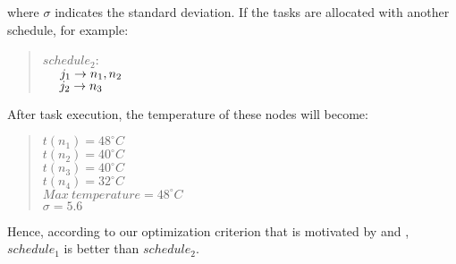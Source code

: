 where $\sigma$ indicates the standard deviation. If the tasks are allocated with another schedule, for example: 
  
\begin{quote}
$schedule_2$: \\
$\mbox{~~~~} j_1\to n_1, n_2$ \\
$\mbox{~~~~} j_2 \to n_3$ \\
\end{quote}

After task execution, the temperature of these nodes will become:

\begin{quote}
$t(n_1)=48^\circ C$ \\
$t(n_2)=40^\circ C$ \\
$t(n_3)=40^\circ C$ \\ 
$t(n_4)=32^\circ C$ \\
$Max~temperature=48^\circ C$ \\
$\sigma=5.6$ \\
\end{quote}

Hence, according to our optimization criterion that is motivated by \cite{??} and \cite{??}, $schedule_1$ is better than $schedule_2$.

\begin{comment}
As presented in \cite{DBLP:conf/aPcsac/VandersterBD07}, differenttypes of tasks have different temperature profiles, i.e. different tasks result in different temperature increase on the same computing nodes. Based on the experiment result in \cite{DBLP:conf/aPcsac/VandersterBD07}, we present an example to illustrate our thermal-aware task scheduling ???\footnote{word missing} that is an essential part of our architectural design and aims to keep the temperature distribution in the data centers as even as possible. \GVL{why is this important, why would that reduce the cost. ...}  
\end{comment}



